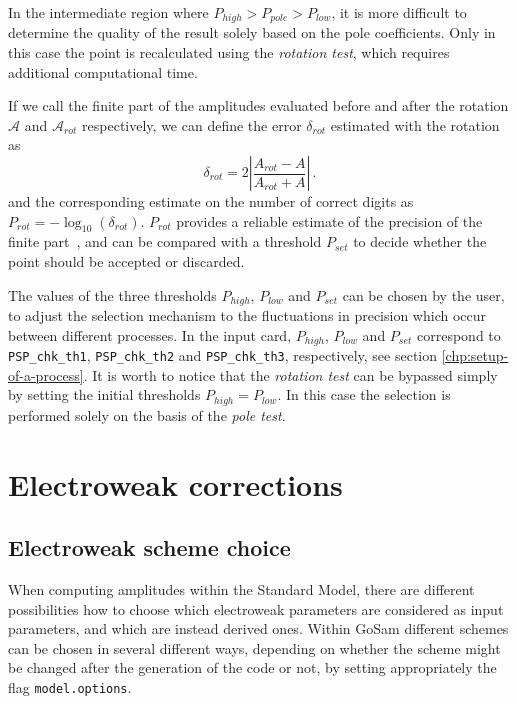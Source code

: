 \documentclass[11pt,a4paper]{refrep}
\newcommand{\gosam}{{\sc GoSam}\xspace}
\def\A{\mathcal{A}}
\newcommand{\be}{\begin{equation}}
\newcommand{\ee}{\end{equation}}
\begin{document}
In the intermediate region where $ P_{high} > P_{pole} >  P_{low}$, it is more difficult to determine the quality of the result solely based on the pole coefficients. Only in this case the point is recalculated using the {\it rotation test}, which requires additional computational time. 

If we call the finite part of the amplitudes evaluated before and after the rotation $\A$ and  $\A_{rot}$ respectively,  we can define the error $ \delta_{rot}$ estimated with the rotation  as  
\be  \label{eq:errd} \delta_{rot} =  2 \left  |\frac{ A_{rot} - A }{ A_{rot} + A} \right  |\, . \ee
and the corresponding estimate on the number of correct digits as $P_{rot} = - \log_{10} (\delta_{rot})$.
$P_{rot}$ provides a reliable estimate of the precision of the finite part~\cite{vanDeurzen:2013saa}, and can be compared with a threshold $P_{set}$ to decide whether the point should be accepted or discarded. 

The values of the three thresholds $ P_{high} $,  $P_{low}$ and $P_{set}$ can be chosen by the user, to adjust the selection mechanism to the fluctuations in precision which occur between different processes. In the input card, $ P_{high} $,  $P_{low}$ and $P_{set}$ correspond to 
\texttt{PSP\_chk\_th1}, \texttt{PSP\_chk\_th2} and \texttt{PSP\_chk\_th3}, 
respectively, see section \ref{chp:setup-of-a-process}.
It is worth to notice that the {\it rotation test} can be bypassed simply by setting the initial thresholds $P_{high}= P_{low}$. In this case the selection is performed solely on the basis of the {\it pole test}.


\chapter{Electroweak corrections}


\section{Electroweak scheme choice}
\label{sec:ewchoose}
When computing amplitudes within the Standard Model, there are different
possibilities how to choose which electroweak parameters are
considered as input parameters, and which are instead derived
ones. Within \gosam{} different schemes can be chosen in several
different ways, depending on whether the scheme might be changed after
the generation of the code or not, by setting appropriately the flag
{\tt model.options}.
\end{document}
